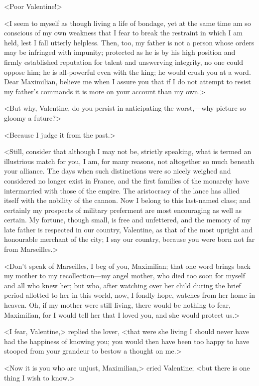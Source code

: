  <Poor Valentine!> 

 <I seem to myself as though living a life of bondage, yet at the same time am so conscious of my own weakness that I fear to break the restraint in which I am held, lest I fall utterly helpless. Then, too, my father is not a person whose orders may be infringed with impunity; protected as he is by his high position and firmly established reputation for talent and unswerving integrity, no one could oppose him; he is all-powerful even with the king; he would crush you at a word. Dear Maximilian, believe me when I assure you that if I do not attempt to resist my father's commands it is more on your account than my own.> 

 <But why, Valentine, do you persist in anticipating the worst,—why picture so gloomy a future?> 

 <Because I judge it from the past.> 

 <Still, consider that although I may not be, strictly speaking, what is termed an illustrious match for you, I am, for many reasons, not altogether so much beneath your alliance. The days when such distinctions were so nicely weighed and considered no longer exist in France, and the first families of the monarchy have intermarried with those of the empire. The aristocracy of the lance has allied itself with the nobility of the cannon. Now I belong to this last-named class; and certainly my prospects of military preferment are most encouraging as well as certain. My fortune, though small, is free and unfettered, and the memory of my late father is respected in our country, Valentine, as that of the most upright and honourable merchant of the city; I say our country, because you were born not far from Marseilles.> 

 <Don't speak of Marseilles, I beg of you, Maximilian; that one word brings back my mother to my recollection—my angel mother, who died too soon for myself and all who knew her; but who, after watching over her child during the brief period allotted to her in this world, now, I fondly hope, watches from her home in heaven. Oh, if my mother were still living, there would be nothing to fear, Maximilian, for I would tell her that I loved you, and she would protect us.> 

 <I fear, Valentine,> replied the lover, <that were she living I should never have had the happiness of knowing you; you would then have been too happy to have stooped from your grandeur to bestow a thought on me.> 

 <Now it is you who are unjust, Maximilian,> cried Valentine; <but there is one thing I wish to know.> 

